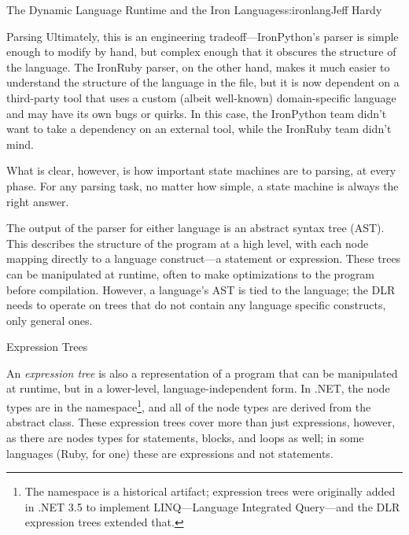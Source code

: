 \begin{aosachapter}{The Dynamic Language Runtime and the Iron Languages}{s:ironlang}{Jeff Hardy}
\begin{aosasect1}{Parsing}
Ultimately, this is an engineering tradeoff---IronPython's parser is simple
enough to modify by hand, but complex enough that it obscures the structure of
the language. The IronRuby parser, on the other hand, makes it much easier to
understand the structure of the language in the  file, but it is
now dependent on a third-party tool that uses a custom (albeit well-known)
domain-specific language and may have its own bugs or quirks. In this case, the
IronPython team didn't want to take a dependency on an external tool, while the
IronRuby team didn't mind.

What is clear, however, is how important state machines are to parsing, at
every phase. For any parsing task, no matter how simple, a state machine is
always the right answer.

The output of the parser for either language is an abstract syntax tree (AST).
This describes the structure of the program at a high level, with each node
mapping directly to a language construct---a statement or expression.  These
trees can be manipulated at runtime, often to make optimizations to the program
before compilation. However, a language's AST is tied to the language; the DLR
needs to operate on trees that do not contain any language specific constructs,
only general ones.

\end{aosasect1}

\begin{aosasect1}{Expression Trees}

An \emph{expression tree} is also a representation of a program that can be
manipulated at runtime, but in a lower-level, language-independent form. In
.NET, the node types are in the 
namespace\footnote{The namespace is a historical artifact; expression trees
were originally added in .NET 3.5 to implement LINQ---Language Integrated
Query---and the DLR expression trees extended that.}, and all of the node types
are derived from the abstract  class. These expression trees
cover more than just expressions, however, as there are nodes types for
 statements,  blocks, and loops as well; in some languages
(Ruby, for one) these are expressions and not statements.


\end{aosasect1}
\end{aosachapter}
